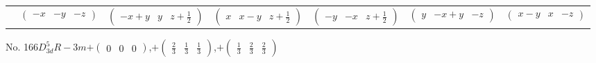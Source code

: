 \documentclass[fleqn,9pt,landscape]{jsarticle}
\begin{document}
\begin{center}
\begin{longtable}{ccccccc}
& $ \begin{pmatrix} - x & - y & - z \end{pmatrix} $ & $ \begin{pmatrix} - x + y & y & z + \frac{1}{2} \end{pmatrix} $ & $ \begin{pmatrix} x & x - y & z + \frac{1}{2} \end{pmatrix} $ & $ \begin{pmatrix} - y & - x & z + \frac{1}{2} \end{pmatrix} $ & $ \begin{pmatrix} y & - x + y & - z \end{pmatrix} $ & $ \begin{pmatrix} x - y & x & - z \end{pmatrix} $ \\
\end{longtable}
\end{center}
\newpage
No. 166\quad$D_{3d}^{5}$\quad$R-3m$\quad[ trigonal ]\quad$+\begin{pmatrix} 0 & 0 & 0 \end{pmatrix}$,\quad $+\begin{pmatrix} \frac{2}{3} & \frac{1}{3} & \frac{1}{3} \end{pmatrix}$,\quad $+\begin{pmatrix} \frac{1}{3} & \frac{2}{3} & \frac{2}{3} \end{pmatrix}$
\end{document}
